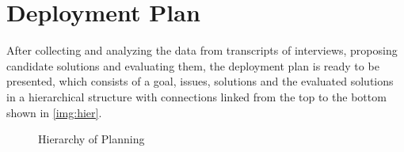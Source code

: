 
\section{Deployment Plan}

After collecting and analyzing the data from transcripts of interviews, proposing candidate solutions and evaluating them, the deployment plan is ready to be presented, which consists of a goal, issues, solutions and the evaluated solutions in a hierarchical structure with connections linked from the top to the bottom shown in \autoref{img:hier}.

\begin{figure}[ht]
\centering
\caption{Hierarchy of Planning}
\label{img:hier}
\end{figure}





